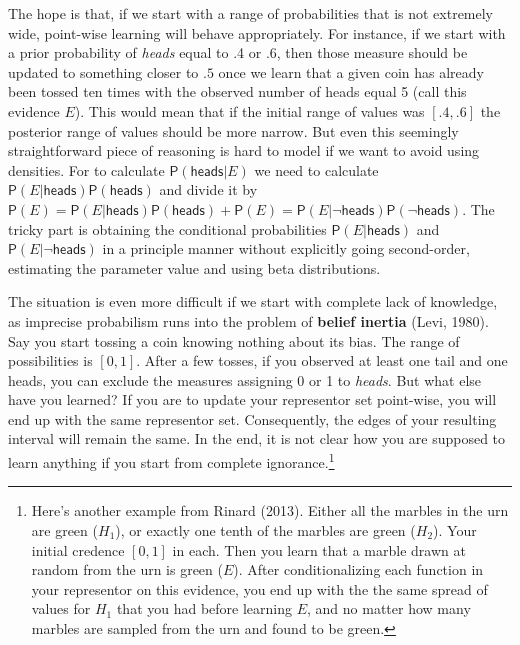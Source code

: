 \documentclass[
  10pt,
  dvipsnames,enabledeprecatedfontcommands]{scrartcl}
\newcommand{\pr}[1]{\mathsf{P}(#1)}
\newcommand{\s}[1]{\mbox{$\mathsf{#1}$}}
\begin{document}
\noindent The hope is that, if we start with a range of probabilities
that is not extremely wide, point-wise learning will behave
appropriately. For instance, if we start with a prior probability of
\emph{heads} equal to .4 or .6, then those measure should be updated to
something closer to \(.5\) once we learn that a given coin has already
been tossed ten times with the observed number of heads equal 5 (call
this evidence \(E\)). This would mean that if the initial range of
values was \([.4,.6]\) the posterior range of values should be more
narrow. But even this seemingly straightforward piece of reasoning is
hard to model if we want to avoid using densities. For to calculate
\(\pr{\s{heads}\vert E}\) we need to calculate
\(\pr{E \vert \s{heads}}\pr{\s{heads}}\) and divide it by
\(\pr{E} = \pr{E \vert \s{heads}}\pr{\s{heads}} + \pr{E} = \pr{E \vert \neg \s{heads}}\pr{\neg \s{heads}}\).
The tricky part is obtaining the conditional probabilities
\(\pr{E \vert \s{heads}}\) and \(\pr{E \vert \neg \s{heads}}\) in a
principle manner without explicitly going second-order, estimating the
parameter value and using beta distributions.

The situation is even more difficult if we start with complete lack of
knowledge, as imprecise probabilism runs into the problem of
\textbf{belief inertia} (Levi, 1980). Say you start tossing a coin
knowing nothing about its bias. The range of possibilities is \([0,1]\).
After a few tosses, if you observed at least one tail and one heads, you
can exclude the measures assigning 0 or 1 to \emph{heads}. But what else
have you learned? If you are to update your representor set point-wise,
you will end up with the same representor set. Consequently, the edges
of your resulting interval will remain the same. In the end, it is not
clear how you are supposed to learn anything if you start from complete
ignorance.\footnote{Here's another example from Rinard (2013). Either
  all the marbles in the urn are green (\(H_1\)), or exactly one tenth
  of the marbles are green (\(H_2\)). Your initial credence \([0,1]\) in
  each. Then you learn that a marble drawn at random from the urn is
  green (\(E\)). After conditionalizing each function in your
  representor on this evidence, you end up with the the same spread of
  values for \(H_1\) that you had before learning \(E\), and no matter
  how many marbles are sampled from the urn and found to be green.}
\end{document}
